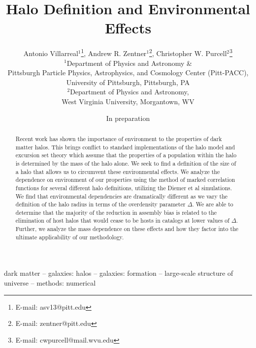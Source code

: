 \documentclass[usenatbib,usegraphicx,letterpaper]{mn2e}
\begin{document}
\title[Halo Environmental Effects as a Function of Halo Definition]{Halo Definition and Environmental Effects}
\author[Antonio Villarreal, Andrew R. Zentner, Christopher W. Purcell]
{Antonio Villarreal$^1$\thanks{E-mail: asv13@pitt.edu},
 Andrew R. Zentner$^1$\thanks{E-mail: zentner@pitt.edu}, 
 Christopher W. Purcell$^2$\thanks{E-mail: cwpurcell@mail.wvu.edu}\\
$^{1}$Department of Physics and Astronomy \& \\
Pittsburgh Particle Physics, Astrophysics, and Cosmology Center (Pitt-PACC),\\ 
University of Pittsburgh, Pittsburgh, PA\\
$^{2}$Department of Physics and Astronomy, \\
West Virginia University, Morgantown, WV}

\date{In preparation}



\maketitle

\begin{abstract}
Recent work has shown the importance of environment to the properties of dark matter halos. This brings conflict to standard implementations of the halo model and excursion set theory which assume that the properties of a population within the halo is determined by the mass of the halo alone. We seek to find a definition of the size of a halo that allows us to circumvent these environmental effects. We analyze the dependence on environment of our properties using the method of marked correlation functions for several different halo definitions, utilizing the Diemer et al simulations. We find that environmental dependencies are dramatically different as we vary the definition of the halo radius in terms of the overdensity parameter $\Delta$. We are able to determine that the majority of the reduction in assembly bias is related to the elimination of host halos that would cease to be hosts in catalogs at lower values of $\Delta$. Further, we analyze the mass dependence on these effects and how they factor into the ultimate applicability of our methodology.
\end{abstract}

\begin{keywords}
dark matter -- galaxies: halos -- galaxies: formation -- large-scale structure of universe -- methods: numerical
\end{keywords}
\end{document}
